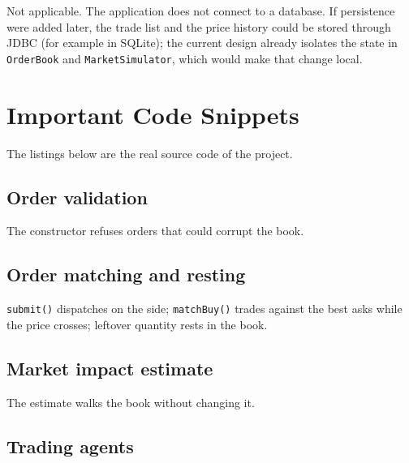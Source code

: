\documentclass[12pt,a4paper,openany,oneside]{report}
\newcommand{\code}[1]{\texttt{#1}}
\newcommand{\keeplisting}[2][]{}
\begin{document}
Not applicable. The application does not connect to a database. If persistence were added later, the trade list and the price history could be stored through JDBC (for example in SQLite); the current design already isolates the state in \code{OrderBook} and \code{MarketSimulator}, which would make that change local.

\section{Important Code Snippets}

The listings below are the real source code of the project.

\subsection*{Order validation}
The constructor refuses orders that could corrupt the book.
\keeplisting[firstline=14,lastline=25,firstnumber=14,caption={\code{Order} constructor (Order.java).},label={lst:order}]{../Order.java}

\subsection*{Order matching and resting}
\code{submit()} dispatches on the side; \code{matchBuy()} trades against the best asks while the price crosses; leftover quantity rests in the book.
\keeplisting[firstline=23,lastline=47,firstnumber=23,caption={\code{OrderBook.submit()} and \code{matchBuy()} (OrderBook.java).},label={lst:match}]{../OrderBook.java}

\keeplisting[firstline=61,lastline=79,firstnumber=61,caption={Resting, reducing a level and recording a trade (OrderBook.java).},label={lst:rest}]{../OrderBook.java}

\subsection*{Market impact estimate}
The estimate walks the book without changing it.
\keeplisting[firstline=95,lastline=112,firstnumber=95,caption={\code{OrderBook.estimateImpact()} (OrderBook.java).},label={lst:impact}]{../OrderBook.java}

\subsection*{Trading agents}
\keeplisting[firstline=43,lastline=50,firstnumber=43,caption={\code{MarketMaker.act()} (Trader.java).},label={lst:mm}]{../Trader.java}
\end{document}

